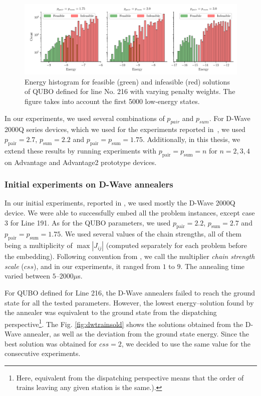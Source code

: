\begin{figure}
  \includegraphics[width=\textwidth]{figures/railway_histograms_bf}
  \caption{Energy histogram for feasible (green) and infeasible (red) solutions of QUBO
    defined for line No. 216 with varying penalty weights. The figure takes into
    account the first 5000 low-energy states.} \label{fig:penaltyhistogram}
\end{figure}
In our experiments, we used several combinations of $p_{pair}$ and $p_{sum}$.
For D-Wave 2000Q series devices, which we used for the experiments reported
in~\cite{railwaydispatching}, we used $p_{\text{pair}}=2.7$,
  $p_{\text{sum}}=2.2$ and $p_{\text{pair}} = p_{\text{sum}} = 1.75$.
    Additionally, in this thesis, we extend these results by running
    experiments with $p_{\text{pair}}=p_{\text{sum}}=n$ for $n=2, 3, 4$ on
Advantage and Advantage2 prototype devices.

\subsubsection{Initial experiments on D-Wave annealers}
In our initial experiments, reported in \cite{railwaydispatching}, we used
mostly the D-Wave 2000Q device. We were able to successfully embed all the
problem instances, except case 3 for Line 191. As for the QUBO parameters, we
used $p_{\text{pair}}=2.2$, $p_{\text{sum}}=2.7$ and
  $p_{\text{pair}}=p_{\text{sum}}=1.75$. We used several values of the chain
    strengths, all of them being a multiplicity of $\max|J_{ij}|$ (computed
separately for each problem before the embedding). Following convention from
\cite{railwaydispatching}, we call the multiplier \emph{chain strength scale}
($css$), and in our experiments, it ranged from $1$ to $9$. The annealing time
varied between $5$--$2000\mu$s.

For QUBO defined for Line 216, the D-Wave annealers failed to reach the ground
state for all the tested parameters. However, the lowest energy--solution found
by the annealer was equivalent to the ground state from the dispatching
perspective\footnote{Here, equivalent from the dispatching perspective means
  that the order of trains leaving any given station is the same.).}. The Fig.
\ref{fig:dwtrainsold} shows the solutions obtained from the D-Wave annealer, as
well as the deviation from the ground state energy. Since the best solution was
obtained for $css=2$, we decided to use the same value for the consecutive
experiments.

